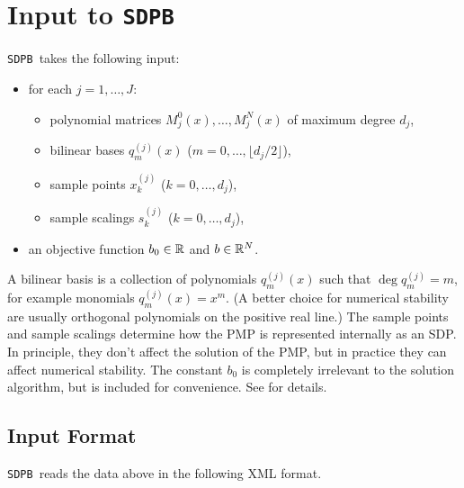 \documentclass[12pt]{article}
\numberwithin{equation}{section}
\newcommand\SDPB{\texttt{SDPB}}
\begin{document}
\section{Input to \SDPB}

\SDPB\ takes the following input:
\begin{itemize}
\item for each $j=1,\dots,J$:
\begin{itemize}
\item polynomial matrices $M^0_j(x),\dots,M^N_j(x)$ of maximum degree $d_j$,
\item bilinear bases $q_m^{(j)}(x)$ ($m=0,\dots,\lfloor d_j/2\rfloor$),
\item sample points $x_k^{(j)}$ ($k=0,\dots,d_j$),
\item sample scalings $s_k^{(j)}$ ($k=0,\dots,d_j$),
\end{itemize}
\item an objective function $b_0\in \mathbb{R}$ and $b\in \mathbb{R}^N$.
\end{itemize}
A bilinear basis is a collection of polynomials $q_m^{(j)}(x)$ such that $\deg q_m^{(j)} = m$, for example monomials $q_m^{(j)}(x)=x^m$.  (A better choice for numerical stability are usually orthogonal polynomials on the positive real line.)  The sample points and sample scalings determine how the PMP is represented internally as an SDP.  In principle, they don't affect the solution of the PMP, but in practice they can affect numerical stability.  The constant $b_0$ is completely irrelevant to the solution algorithm, but is included for convenience.  See \cite{DSD} for details.

\subsection{Input Format}

\SDPB\ reads the data above in the following XML format.
\end{document}
